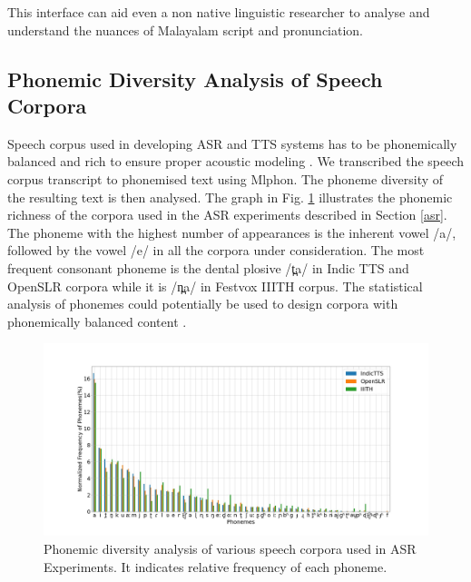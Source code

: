 \documentclass{ieeeaccess}
\begin{document}
This interface can aid even a non native linguistic researcher to analyse and understand the nuances of Malayalam script and pronunciation.





\subsection{Phonemic Diversity Analysis of Speech Corpora}

Speech corpus used in developing ASR and TTS systems has to be phonemically balanced and rich to ensure proper acoustic modeling  \cite{malviya2016structural}. We transcribed the speech corpus transcript to phonemised text using Mlphon. The phoneme diversity of the resulting text is then analysed. The graph in Fig. \ref{phoneticrichness} illustrates the phonemic richness of the corpora used in the ASR experiments described in Section \ref{asr}. The phoneme with the highest number of appearances is the inherent vowel {\ipa /a/}, followed by the vowel {\ipa /e/} in all the corpora under consideration. The most frequent consonant phoneme is the dental plosive {\ipa  /t̪a/} in Indic TTS  \cite{baby2016resources} and OpenSLR \cite{he-etal-2020-open} corpora while it is {\ipa /n̪a/} in Festvox IIITH \cite{prahallad2012iiit} corpus. The statistical analysis of phonemes could potentially be used to design corpora with phonemically balanced content \cite{torres2019emilia}.


\begin{figure}[h]
	\centering
	\includegraphics[width=\linewidth, trim=1cm 1cm 2cm 2cm,clip]{phoneticrichness.jpg}
	\caption{Phonemic diversity analysis of various speech corpora used in ASR Experiments. It indicates relative frequency of each phoneme.}
	\label{phoneticrichness}
\end{figure}
\end{document}
